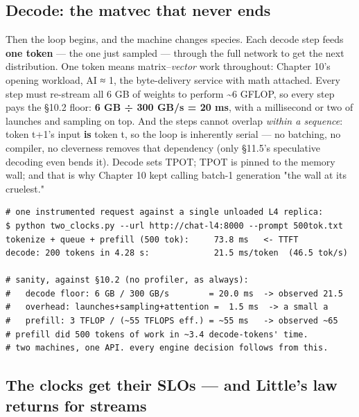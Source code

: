 \subsection*{Decode: the matvec that never ends}

Then the loop begins, and the machine changes species. Each decode step feeds \textbf{one token} — the one just sampled — through the full network to get the next distribution. One token means matrix–\textit{vector} work throughout: Chapter 10's opening workload, AI ≈ 1, the byte-delivery service with math attached. Every step must re-stream all 6 GB of weights to perform \textasciitilde{}6 GFLOP, so every step pays the §10.2 floor: \textbf{6 GB ÷ 300 GB/s = 20 ms}, with a millisecond or two of launches and sampling on top. And the steps cannot overlap \textit{within a sequence}: token t+1's input \textbf{is} token t, so the loop is inherently serial — no batching, no compiler, no cleverness removes that dependency (only §11.5's speculative decoding even bends it). Decode sets TPOT; TPOT is pinned to the memory wall; and that is why Chapter 10 kept calling batch-1 generation "the wall at its cruelest."

\begin{terminalbox}
\begin{Verbatim}[breaklines=true,breakanywhere=true,fontsize=\small,formatcom=\color{tbbtermfg},codes=\tbbcodeactive]
# one instrumented request against a single unloaded L4 replica:
$ python two_clocks.py --url http://chat-l4:8000 --prompt 500tok.txt
tokenize + queue + prefill (500 tok):     73.8 ms   <- TTFT
decode: 200 tokens in 4.28 s:             21.5 ms/token  (46.5 tok/s)

# sanity, against §10.2 (no profiler, as always):
#   decode floor: 6 GB / 300 GB/s        = 20.0 ms  -> observed 21.5
#   overhead: launches+sampling+attention =  1.5 ms  -> a small a
#   prefill: 3 TFLOP / (~55 TFLOPS eff.) = ~55 ms   -> observed ~65
# prefill did 500 tokens of work in ~3.4 decode-tokens' time.
# two machines, one API. every engine decision follows from this.
\end{Verbatim}
\end{terminalbox}

\subsection*{The clocks get their SLOs — and Little's law returns for streams}


